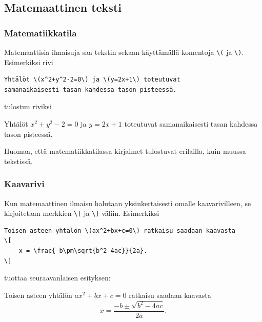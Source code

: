 \subsection{Matemaattinen teksti}
\begin{frame}[fragile]
    \frametitle{Matematiikkatila}
    \pause
    Matemaattisia ilmaisuja saa tekstin sekaan käyttämällä komentoja \verb+\(+  
    ja \verb+\)+. \pause Esimerkiksi rivi
    \begin{Verbatim}[frame=single]
Yhtälöt \(x^2+y^2-2=0\) ja \(y=2x+1\) toteutuvat 
samanaikaisesti tasan kahdessa tason pisteessä.
    \end{Verbatim}
    \pause
    tulostuu riviksi 
    \begin{sample}
        Yhtälöt \(x^2+y^2-2=0\) ja \(y=2x+1\) toteutuvat samanaikaisesti tasan kahdessa tason pisteessä.
    \end{sample} 
    \pause
    Huomaa, että matematiikkatilassa kirjaimet tulostuvat erilailla, kuin muussa tekstissä. 
\end{frame}
\begin{frame}[fragile]
    
\end{frame}
\begin{frame}[fragile]
    \frametitle{Kaavarivi}
    Kun matemaattinen ilmaisu halutaan yksinkertaisesti omalle kaavarivilleen, se kirjoitetaan merkkien \verb-\[- ja \verb-\]- väliin.
    \pause
    Esimerkiksi 
    \begin{footnotesize}
        \begin{Verbatim}[frame=single]
Toisen asteen yhtälön \(ax^2+bx+c=0\) ratkaisu saadaan kaavasta
\[
    x = \frac{-b\pm\sqrt{b^2-4ac}}{2a}.
\]
        \end{Verbatim} 
    \end{footnotesize}
    tuottaa seuraavanlaisen esityksen:
    \pause
    \begin{sample}
        Toisen asteen yhtälön \(ax^2+bx+c=0\)
        ratkaisu saadaan kaavasta
        \[
            x = \frac{-b\pm\sqrt{b^2-4ac}}{2a}.
        \]
    \end{sample}
\end{frame}
